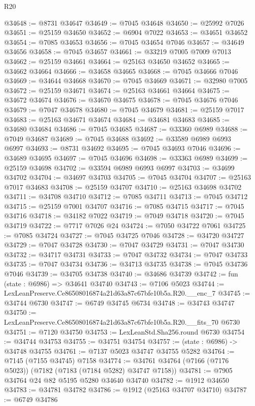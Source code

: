 \begin{lexlean}{R20}
\begin{coremodule}
{@34648 := @8731 @34647
@34649 := @7045 @34648
@34650 := @25992 @7026
@34651 := @25159 @34650
@34652 := @6904 @7022
@34653 := @34651 @34652
@34654 := @7085 @34653
@34656 := @7045 @34654 @7046
@34657 := @34649 @34656
@34658 := @7045 @34657
@34661 := @33219 @7005 @7009 @7013
@34662 := @25159 @34661
@34664 := @25163 @34650 @34652
@34665 := @34662 @34664
@34666 := @34658 @34665
@34668 := @7045 @34666 @7046
@34669 := @34644 @34668
@34670 := @7045 @34669
@34671 := @32980 @7005
@34672 := @25159 @34671
@34674 := @25163 @34661 @34664
@34675 := @34672 @34674
@34676 := @34670 @34675
@34678 := @7045 @34676 @7046
@34679 := @7047 @34678
@34680 := @7045 @34679
@34681 := @25159 @7017
@34683 := @25163 @34671 @34674
@34684 := @34681 @34683
@34685 := @34680 @34684
@34686 := @7045 @34685
@34687 := @33360 @6989
@34688 := @7049 @34687
@34689 := @7045 @34688
@34692 := @33589 @6989 @6993 @6997
@34693 := @8731 @34692
@34695 := @7045 @34693 @7046
@34696 := @34689 @34695
@34697 := @7045 @34696
@34698 := @33363 @6989
@34699 := @25159 @34698
@34702 := @33594 @6989 @6993 @6997
@34703 := @34699 @34702
@34704 := @34697 @34703
@34705 := @7045 @34704
@34707 := @25163 @7017 @34683
@34708 := @25159 @34707
@34710 := @25163 @34698 @34702
@34711 := @34708 @34710
@34712 := @7085 @34711
@34713 := @7045 @34712
@34715 := @25159 @7001 @34707
@34716 := @7085 @34715
@34717 := @7045 @34716
@34718 := @34182 @7022
@34719 := @7049 @34718
@34720 := @7045 @34719
@34722 := @7717 @7026 @24
@34724 := @7050 @34722 @7061
@34725 := @7085 @34724
@34727 := @7045 @34725 @7046
@34728 := @34720 @34727
@34729 := @7047 @34728
@34730 := @7047 @34729
@34731 := @7047 @34730
@34732 := @34717 @34731
@34733 := @7047 @34732
@34734 := @7047 @34733
@34735 := @7047 @34734
@34736 := @34713 @34735
@34738 := @7045 @34736 @7046
@34739 := @34705 @34738
@34740 := @34686 @34739
@34742 := fun (state : @6986) => @34641 @34740
@34743 := @7106 @5023
@34744 := LexLeanPreserve.Ce86508016874a21d63a87c67bfe10b5a.R20.__enc_7
@34745 := @34744 @6730
@34747 := @6749 @34745 @6734
@34748 := @34743 @34747
@34750 := LexLeanPreserve.Ce86508016874a21d63a87c67bfe10b5a.R20.__fits_70 @6730
@34751 := @7120 @34750
@34753 := LexLeanStd.Sha256.round @6730
@34754 := @34744 @34753
@34755 := @34751 @34754
@34757 := (state : @6986) -> @34748 @34755
@34761 := @7137 @5023 @34747 @34755 @5282
@34764 := @7145 (@7155 @34745) @7158
@34774 := @34761 @34764 (@7166 (@7176 @5023)) (@7182 (@7183 (@7184 @5282) @34747 @7158))
@34781 := @7905 @34764 @24 @82 @5195 @5280 @34640 @34740
@34782 := @1912 @34650
@34783 := @34781 @34782
@34786 := @1912 (@25163 @34707 @34710)
@34787 := @6749 @34786
}
\end{coremodule}
\end{lexlean}
